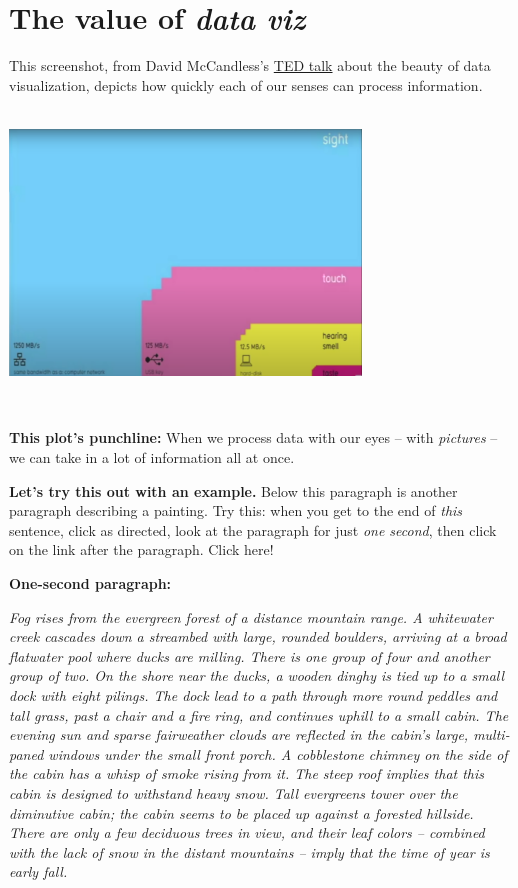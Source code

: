 \documentclass[
]{book}
\begin{document}
\hypertarget{the-value-of-data-viz}{%
\section*{\texorpdfstring{The value of \emph{data viz}}{The value of data viz}}\label{the-value-of-data-viz}}

This screenshot, from David McCandless's \href{https://www.youtube.com/watch?v=5Zg-C8AAIGg}{TED talk} about the beauty of data visualization, depicts how quickly each of our senses can process information.

~\\

\includegraphics[width=0.7\textwidth,height=\textheight]{img/vis0.png}

~

\textbf{This plot's punchline:} When we process data with our eyes -- with \emph{pictures} -- we can take in a lot of information all at once.

\textbf{Let's try this out with an example.} Below this paragraph is another paragraph describing a painting. Try this: when you get to the end of \emph{this} sentence, click as directed, look at the paragraph for just \emph{one second}, then click on the link after the paragraph. Click here!

\textbf{One-second paragraph:}

\emph{Fog rises from the evergreen forest of a distance mountain range. A whitewater creek cascades down a streambed with large, rounded boulders, arriving at a broad flatwater pool where ducks are milling. There is one group of four and another group of two. On the shore near the ducks, a wooden dinghy is tied up to a small dock with eight pilings. The dock lead to a path through more round peddles and tall grass, past a chair and a fire ring, and continues uphill to a small cabin. The evening sun and sparse fairweather clouds are reflected in the cabin's large, multi-paned windows under the small front porch. A cobblestone chimney on the side of the cabin has a whisp of smoke rising from it. The steep roof implies that this cabin is designed to withstand heavy snow. Tall evergreens tower over the diminutive cabin; the cabin seems to be placed up against a forested hillside. There are only a few deciduous trees in view, and their leaf colors -- combined with the lack of snow in the distant mountains -- imply that the time of year is early fall.}
\end{document}
